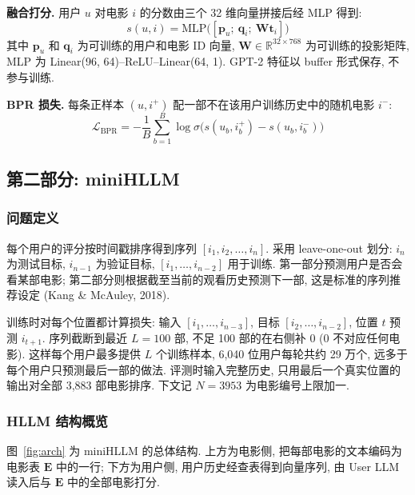 \documentclass{article}
\begin{document}
\textbf{融合打分.} 用户 $u$ 对电影 $i$ 的分数由三个 32 维向量拼接后经 MLP 得到:
\[
s(u,i) = \mathrm{MLP}\big([\mathbf{p}_u;\ \mathbf{q}_i;\ \mathbf{W}\mathbf{t}_i]\big)
\]
其中 $\mathbf{p}_u$ 和 $\mathbf{q}_i$ 为可训练的用户和电影 ID 向量, $\mathbf{W}\in\mathbb{R}^{32\times 768}$ 为可训练的投影矩阵, MLP 为 Linear(96, 64)--ReLU--Linear(64, 1). GPT-2 特征以 buffer 形式保存, 不参与训练.

\textbf{BPR 损失.} 每条正样本 $(u, i^+)$ 配一部不在该用户训练历史中的随机电影 $i^-$:
\[
\mathcal{L}_{\mathrm{BPR}} = -\frac{1}{B}\sum_{b=1}^{B}\log\sigma\big(s(u_b,i_b^+)-s(u_b,i_b^-)\big)
\]

\subsection{第二部分: miniHLLM}

\subsubsection{问题定义}

每个用户的评分按时间戳排序得到序列 $[i_1, i_2, \ldots, i_n]$. 采用 leave-one-out 划分: $i_n$ 为测试目标, $i_{n-1}$ 为验证目标, $[i_1,\ldots,i_{n-2}]$ 用于训练. 第一部分预测用户是否会看某部电影; 第二部分则根据截至当前的观看历史预测下一部, 这是标准的序列推荐设定 (Kang \& McAuley, 2018).

训练时对每个位置都计算损失: 输入 $[i_1,\ldots,i_{n-3}]$, 目标 $[i_2,\ldots,i_{n-2}]$, 位置 $t$ 预测 $i_{t+1}$. 序列截断到最近 $L=100$ 部, 不足 100 部的在右侧补 0 (0 不对应任何电影). 这样每个用户最多提供 $L$ 个训练样本, 6,040 位用户每轮共约 29 万个, 远多于每个用户只预测最后一部的做法. 评测时输入完整历史, 只用最后一个真实位置的输出对全部 3,883 部电影排序. 下文记 $N=3953$ 为电影编号上限加一.

\subsubsection{HLLM 结构概览}

图~\ref{fig:arch} 为 miniHLLM 的总体结构. 上方为电影侧, 把每部电影的文本编码为电影表 $\mathbf{E}$ 中的一行; 下方为用户侧, 用户历史经查表得到向量序列, 由 User LLM 读入后与 $\mathbf{E}$ 中的全部电影打分.
\end{document}
